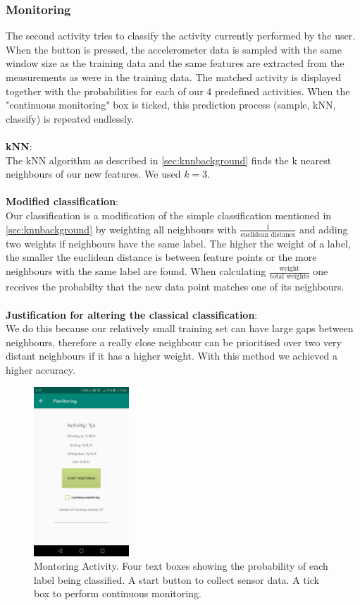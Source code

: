\documentclass[12pt]{article}
\begin{document}
\pagebreak
 
\subsubsection{Monitoring} \label{sec:monitoring}


The second activity tries to classify the activity currently performed by the user. When the button is pressed, the accelerometer data is sampled with the same window size as the training data and the same features are extracted from the measurements as were in the training data. 
The matched activity is displayed together with the probabilities for each of our 4 predefined activities.
When the "continuous monitoring" box is ticked, this prediction process (sample, kNN, classify) is repeated endlessly.
\\\\
\textbf{kNN}:\\
The kNN algorithm as described in \ref{sec:knnbackground} finds the k nearest neighbours of our new features. We used \(k = 3\).
\\\\
\textbf{Modified classification}:\\
Our classification is a modification of the simple classification mentioned in \ref{sec:knnbackground} by weighting all neighbours with \(\frac{1}{\text{euclidean distance}}\) and adding two weights if neighbours have the same label. The higher the weight of a label, the smaller the euclidean distance is between feature points or the more neighbours with the same label are found. When calculating \(\frac{\text{weight}}{\text{total weights}}\) one receives the probabilty that the new data point matches one of its neighbours.
\\\\
\textbf{Justification for altering the classical classification}:\\
We do this because our relatively small training set can have large gaps between neighbours, therefore a really close neighbour can be prioritised over two very distant neighbours if it has a higher weight. With this method we achieved a higher accuracy.

\begin{figure}[h]
  \centering
  \includegraphics[width=135px]{images/monitoring.jpeg}
  \caption{Montoring Activity. Four text boxes showing the probability of each label being classified. A start button to collect sensor data. A tick box to perform continuous monitoring.}
\end{figure}
\end{document}
